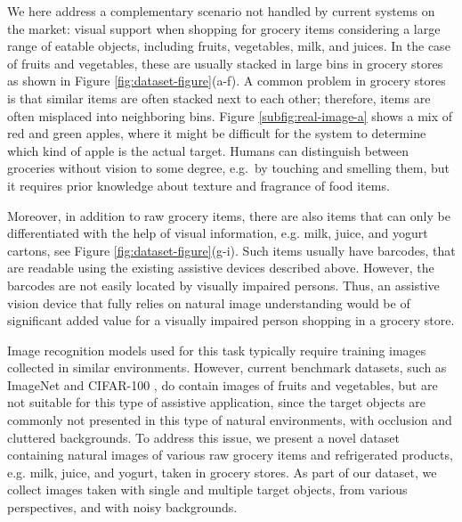 We here address a complementary scenario not handled by current systems on the market: visual support when shopping for grocery items considering a large range of eatable objects, including fruits, vegetables, milk, and juices. 
In the case of fruits and vegetables, these are usually stacked in large bins in grocery stores as shown in Figure \ref{fig:dataset-figure}(a-f). A common problem in grocery stores is that similar items are often stacked next to each other; therefore, items are often misplaced into neighboring bins. Figure \ref{subfig:real-image-a} shows a mix of red and green apples, where it might be difficult for the system to determine which kind of apple is the actual target.
Humans can distinguish between groceries without vision to some degree, e.g.~by touching and smelling them, but it requires prior knowledge about texture and fragrance of food items.

Moreover, in addition to raw grocery items, there are also items that can only be differentiated with the help of visual information, e.g. milk, juice, and yogurt cartons, see Figure \ref{fig:dataset-figure}(g-i). Such items usually have barcodes, that are readable using the existing assistive devices described above. However, the barcodes are not easily located by visually impaired persons. Thus, an assistive vision device that fully relies on natural image understanding would be of significant added value for a visually impaired person shopping in a grocery store.

Image recognition models used for this task typically require training images collected in similar environments. However, current benchmark datasets, such as ImageNet  and CIFAR-100 , do contain images of fruits and vegetables, but are not suitable for this type of assistive application, 
since the target objects are commonly not presented in this type of natural environments, with occlusion and cluttered backgrounds. To address this issue, we present a novel dataset containing natural images of various raw grocery items and refrigerated products, e.g. milk, juice, and yogurt, taken in grocery stores. As part of our dataset, we collect images taken with single and multiple target objects, from various perspectives, and with noisy backgrounds.


